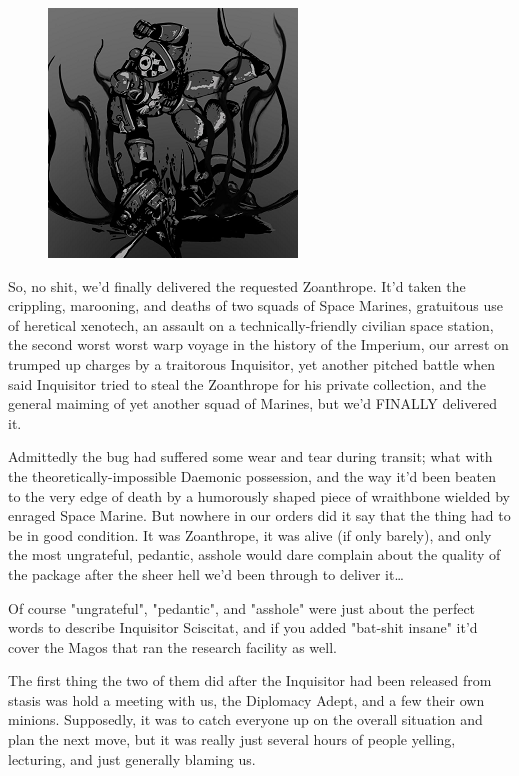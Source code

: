 \begin{figure}
	\begin{center}
		\includegraphics[width=\figwidth]{pics/17/5.png}
	\end{center}
\end{figure}
So, no shit, we'd finally delivered the requested Zoanthrope. 
It'd taken the crippling, marooning, and deaths of two squads of Space Marines, gratuitous use of heretical xenotech, an assault on a technically-friendly civilian space station, the second worst worst warp voyage in the history of the Imperium, our arrest on trumped up charges by a traitorous Inquisitor, yet another pitched battle when said Inquisitor tried to steal the Zoanthrope for his private collection, and the general maiming of yet another squad of Marines, but we'd FINALLY delivered it. 


Admittedly the bug had suffered some wear and tear during transit; 
what with the theoretically-impossible Daemonic possession, and the way it'd been beaten to the very edge of death by a humorously shaped piece of wraithbone wielded by enraged Space Marine. 
But nowhere in our orders did it say that the thing had to be in good condition. 
It was Zoanthrope, it was alive (if only barely), and only the most ungrateful, pedantic, asshole would dare complain about the quality of the package after the sheer hell we'd been through to deliver it…

Of course "ungrateful", "pedantic", and "asshole" were just about the perfect words to describe Inquisitor Sciscitat, and if you added "bat-shit insane" it'd cover the Magos that ran the research facility as well.

The first thing the two of them did after the Inquisitor had been released from stasis was hold a meeting with us, the Diplomacy Adept, and a few their own minions. 
Supposedly, it was to catch everyone up on the overall situation and plan the next move, but it was really just several hours of people yelling, lecturing, and just generally blaming us.

